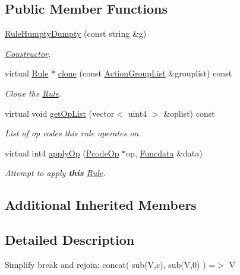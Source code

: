 \subsection*{Public Member Functions}
\begin{DoxyCompactItemize}
\item 
\mbox{\hyperlink{class_rule_humpty_dumpty_a7f2b3a7bbb13035c4df221e0d8a889e2}{Rule\+Humpty\+Dumpty}} (const string \&g)
\begin{DoxyCompactList}\small\item\em \mbox{\hyperlink{class_constructor}{Constructor}}. \end{DoxyCompactList}\item 
virtual \mbox{\hyperlink{class_rule}{Rule}} $\ast$ \mbox{\hyperlink{class_rule_humpty_dumpty_a7fe5c55ca82d167ba7da46f2081e0c56}{clone}} (const \mbox{\hyperlink{class_action_group_list}{Action\+Group\+List}} \&grouplist) const
\begin{DoxyCompactList}\small\item\em Clone the \mbox{\hyperlink{class_rule}{Rule}}. \end{DoxyCompactList}\item 
virtual void \mbox{\hyperlink{class_rule_humpty_dumpty_a4893b92602fa296e01d9a782f633034a}{get\+Op\+List}} (vector$<$ uint4 $>$ \&oplist) const
\begin{DoxyCompactList}\small\item\em List of op codes this rule operates on. \end{DoxyCompactList}\item 
virtual int4 \mbox{\hyperlink{class_rule_humpty_dumpty_a49a97daa382a5e01626144d914438301}{apply\+Op}} (\mbox{\hyperlink{class_pcode_op}{Pcode\+Op}} $\ast$op, \mbox{\hyperlink{class_funcdata}{Funcdata}} \&data)
\begin{DoxyCompactList}\small\item\em Attempt to apply {\bfseries{this}} \mbox{\hyperlink{class_rule}{Rule}}. \end{DoxyCompactList}\end{DoxyCompactItemize}
\subsection*{Additional Inherited Members}


\subsection{Detailed Description}
Simplify break and rejoin\+: {\ttfamily concat( sub(\+V,c), sub(\+V,0) ) =$>$ V} 

